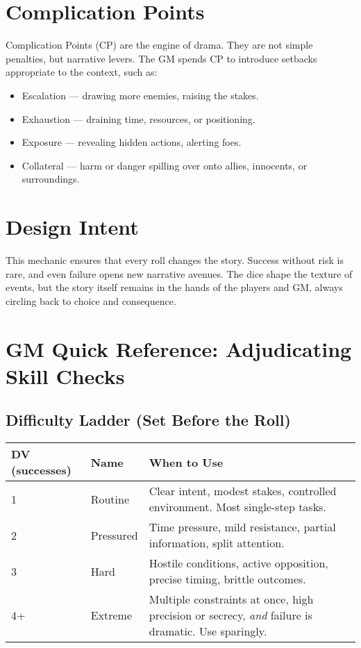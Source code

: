 \documentclass[12pt]{book}
\begin{document}
\section{Complication Points}

Complication Points (CP) are the engine of drama. They are not simple penalties, but narrative levers.  
The GM spends CP to introduce setbacks appropriate to the context, such as:

\begin{itemize}
  \item Escalation — drawing more enemies, raising the stakes.  
  \item Exhaustion — draining time, resources, or positioning.  
  \item Exposure — revealing hidden actions, alerting foes.  
  \item Collateral — harm or danger spilling over onto allies, innocents, or surroundings.  
\end{itemize}

\section{Design Intent}

This mechanic ensures that every roll changes the story. Success without risk is rare, and even failure opens new narrative avenues. The dice shape the texture of events, but the story itself remains in the hands of the players and GM, always circling back to choice and consequence.

\section{GM Quick Reference: Adjudicating Skill Checks}

\subsection{Difficulty Ladder (Set Before the Roll)}
\begin{tabular}{@{}llp{8.5cm}@{}}
\toprule
\textbf{DV (successes)} & \textbf{Name} & \textbf{When to Use} \\
\midrule
1 & Routine & Clear intent, modest stakes, controlled environment. Most single-step tasks. \\
2 & Pressured & Time pressure, mild resistance, partial information, split attention. \\
3 & Hard & Hostile conditions, active opposition, precise timing, brittle outcomes. \\
4+ & Extreme & Multiple constraints at once, high precision or secrecy, \emph{and} failure is dramatic. Use sparingly. \\
\bottomrule
\end{tabular}
\end{document}
